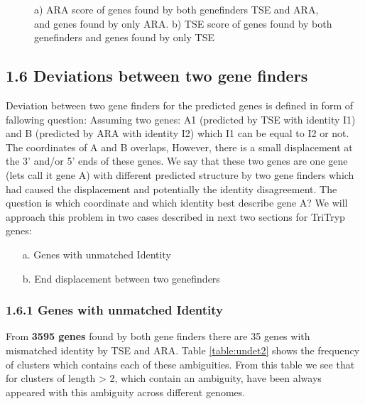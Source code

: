 \documentclass[table,
12pt, %
a4paper, %
oneside, %
headinclude,footinclude, %
BCOR5mm, %
]{scrartcl}
\begin{document}
\begin{figure}[H]%
  \centering
  \caption{a) ARA score of genes found by both genefinders TSE and ARA, and genes found by only ARA. b) TSE score of genes found by both genefinders and genes found by only TSE}%
  \label{fig:aratsescore}%
\end{figure}




\newpage
\subsection{\textbf{1.6 Deviations between two gene finders}}
Deviation between two gene finders for the predicted genes is defined in form of fallowing question:
Assuming two genes: A1 (predicted by TSE with identity I1) and B (predicted by ARA with identity I2) which I1 can be equal to I2 or not. The coordinates of A and B overlaps, However, there is a small displacement at the 3' and/or 5' ends of these genes. We say that these two genes are one gene (lets call it gene A) with different predicted structure by two gene finders which had caused the displacement and potentially the identity disagreement. The question is which coordinate and which identity best describe gene A? We will approach this problem in two cases described in next two sections for TriTryp genes:
\begin{itemize}
  \item[a.] Genes with unmatched Identity
  \item[b.] End displacement between two genefinders
\end{itemize}
\subsubsection{\textbf{1.6.1 Genes with unmatched Identity}}
From \textbf{3595 genes} found by both gene finders there are 35 genes with mismatched identity by TSE and ARA. Table \ref{table:undet2} shows the frequency of clusters which contains each of these ambiguities. From this table we see that for clusters of length > 2, which contain an ambiguity, have been always appeared with this ambiguity across different genomes.
\end{document}
